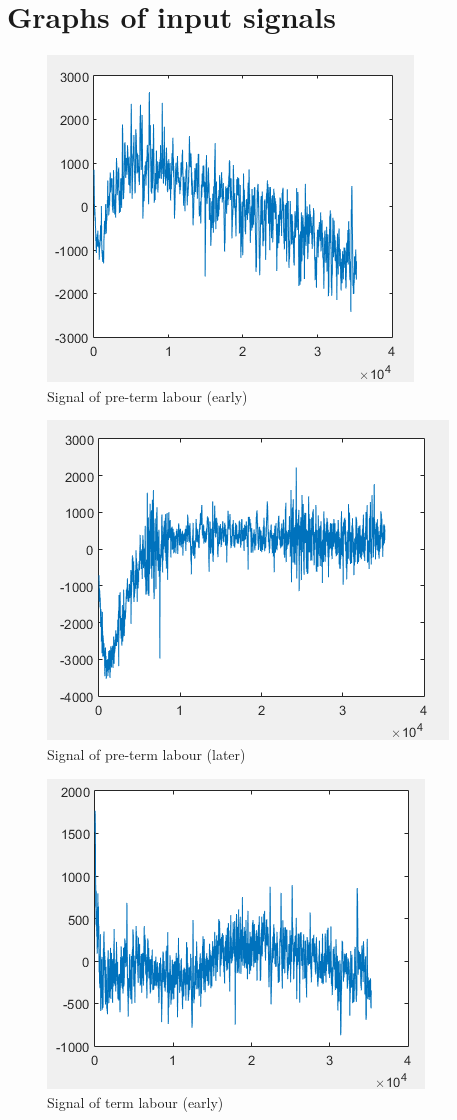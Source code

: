 \documentclass[a4paper,10pt]{article}
\begin{document}
\section {Graphs of input signals}
\begin{figure}[H]
\includegraphics{f1}
\caption{Signal of pre-term labour (early)}
\end{figure}
\begin{figure}[H]
\includegraphics{f2}
\caption{Signal of pre-term labour (later)}
\end{figure}
\begin{figure}[H]
\includegraphics{f3}
\caption{Signal of term labour (early)}
\end{figure}
\end{document}
